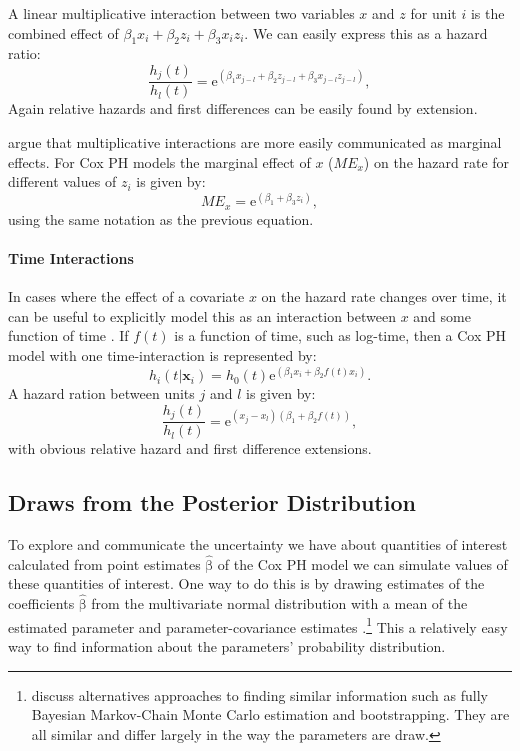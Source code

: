 \documentclass[nojss]{jss}\usepackage{graphicx, color}
\begin{document}
A linear multiplicative interaction between two variables $x$ and $z$ for unit $i$ is the combined effect of $\beta_{1}x_{i} + \beta_{2}z_{i} + \beta_{3}x_{i}z_{i}$. We can easily express this as a hazard ratio:
%
\begin{equation}
	\frac{h_{j}(t)}{h_{l}(t)} = \mathrm{e}^{(\beta_{1}x_{j-l} + \beta_{2}z_{j-l} + \beta_{3}x_{j-l}z_{j-l})},
\end{equation}
%
Again relative hazards and first differences can be easily found by extension.

\cite{Brambor2006} argue that multiplicative interactions are more easily communicated as marginal effects. For Cox PH models the marginal effect of $x$ ($ME_{x}$) on the hazard rate for different values of $z_{i}$ is given by:
%
\begin{equation}
	ME_{x} = \mathrm{e}^{(\beta_{1} + \beta_{3}z_{i})},
\end{equation}
% 
using the same notation as the previous equation.

\paragraph{Time Interactions}

In cases where the effect of a covariate $x$ on the hazard rate changes over time, it can be useful to explicitly model this as an interaction between $x$ and some function of time \cite{Licht2011,BoxSteffensmeier2003,boxsteffensmeier2004}. If $f(t)$ is a function of time, such as log-time, then a Cox PH model with one time-interaction is represented by:
%
\begin{equation}
	h_{i}(t|\mathbf{x}_{i})=h_{0}(t)\mathrm{e}^{(\beta_{1}x_{i} + \beta_{2}f(t)x_{i})}.
\end{equation}
%
A hazard ration between units $j$ and $l$ is given by:
%
\begin{equation}
	\frac{h_{j}(t)}{h_{l}(t)} = \mathrm{e}^{(x_{j} - x_{l})(\beta_{1} + \beta_{2}f(t))},
\end{equation} 
%
with obvious relative hazard and first difference extensions.

\subsection{Draws from the Posterior Distribution}

To explore and communicate the uncertainty we have about quantities of interest calculated from point estimates $\mathrm{\hat{\beta}}$ of the Cox PH model we can simulate values of these quantities of interest. One way to do this is by drawing estimates of the coefficients $\mathrm{\hat{\beta}}$ from the multivariate normal distribution with a mean of the estimated parameter and parameter-covariance estimates \citep{King2000,Licht2011}.\footnote{\cite{King2000} discuss alternatives approaches to finding similar information such as fully Bayesian Markov-Chain Monte Carlo estimation and bootstrapping. They are all similar and differ largely in the way the parameters are draw.} This a relatively easy way to find information about the parameters' probability distribution. 
\end{document}
